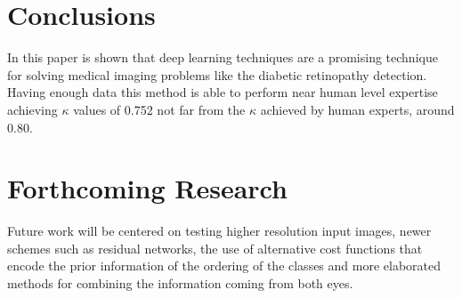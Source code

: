 \documentclass[a0,portrait]{a0poster}
\begin{document}
\begin{multicols}{3}

\color{SaddleBrown} %

\section*{Conclusions}

In this paper is shown that deep learning techniques are a promising technique for solving medical imaging problems like the diabetic retinopathy detection. Having enough data this method is able to perform near human level expertise achieving $\kappa$ values of 0.752 not far from the $\kappa$ achieved by human experts, around 0.80. 

\color{DarkSlateGray} %


\section*{Forthcoming Research}

Future work will be centered on testing higher resolution input images, newer schemes such as residual networks, the use of alternative cost functions that encode the prior information of the ordering of the classes and more elaborated methods for combining the information coming from both eyes.





\end{multicols}
\end{document}
